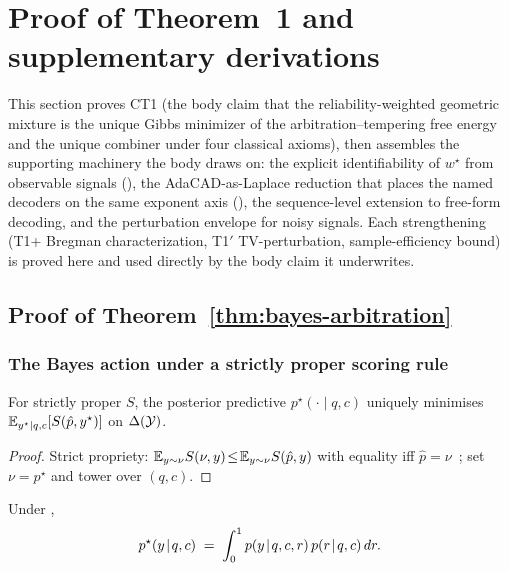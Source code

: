 \section{Proof of Theorem~1 and supplementary derivations}
\label{app:letter-C}

This section proves CT1 (the body claim that the
reliability-weighted geometric mixture is the unique Gibbs
minimizer of the arbitration--tempering free energy and the unique
combiner under four classical axioms), then assembles the
supporting machinery the body draws on: the explicit
identifiability of $w^\star$ from observable signals
(), the AdaCAD-as-Laplace reduction
that places the named decoders on the same exponent axis
(), the sequence-level extension to
free-form decoding, and the perturbation envelope for noisy
signals.  Each strengthening (T1+ Bregman characterization, T1$'$
TV-perturbation, sample-efficiency bound) is proved here and used
directly by the body claim it underwrites.

\subsection{Proof of Theorem~\ref{thm:bayes-arbitration}}
\label{app:thm1}

\subsubsection{The Bayes action under a strictly proper scoring rule}
\label{app:thm1-bayes-action}

\begin{proposition}
\label{prop:thm1-step1}
For strictly proper $S$, the posterior predictive
$p^\star(\cdot\!\mid\!q,c)$ uniquely minimises
$\mathbb{E}_{y^\star\mid q,c}[S(\hat p,y^\star)]$ on $\Delta(\mathcal{Y})$.
\end{proposition}

\begin{proof}
Strict propriety: $\mathbb{E}_{y\sim\nu}S(\nu,y)\!\le\!\mathbb{E}_{y\sim\nu}S(\hat p,y)$
with equality iff $\hat p\!=\!\nu$~\citep{guo2017oncalibration};
set $\nu\!=\!p^\star$ and tower over $(q,c)$.
\end{proof}

\begin{proposition}
\label{prop:thm1-step2}
Under ,
\begin{equation}
p^\star(y\!\mid\!q,c)\;=\;\int_0^1 p(y\!\mid\!q,c,r)\,p(r\!\mid\!q,c)\,dr.
\label{eq:thm1-integral}
\end{equation}
\end{proposition}

